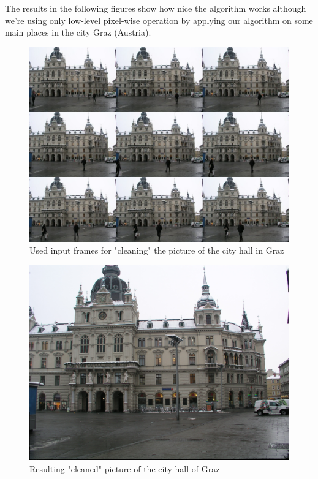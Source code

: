 The results in the following figures show how nice the algorithm works although we're using only low-level pixel-wise operation by applying our algorithm on some main places in the city Graz (Austria).

\begin{figure}[h!t]
\centering
\includegraphics[scale = 0.43]{pics/rathaus.jpg}
\caption{Used input frames for "cleaning" the picture of the city hall in Graz}
\end{figure}

\begin{figure}[h!t]
\centering
\includegraphics[scale = 0.16]{pics/result.jpg}
\caption{Resulting "cleaned" picture of the city hall of Graz}
\end{figure}

